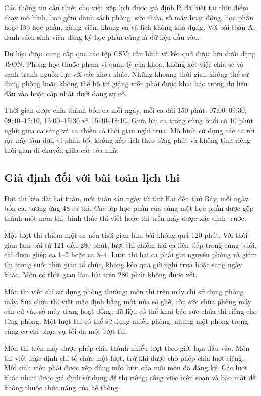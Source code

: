Các thông tin cần thiết cho việc xếp lịch được giả định là đã biết tại thời điểm chạy mô hình, bao gồm danh sách phòng, sức chứa, số máy hoạt động, học phần hoặc lớp học phần, giảng viên, khung ca và lịch không khả dụng. Với bài toán A, danh sách sinh viên đăng ký học phần cũng là dữ liệu đầu vào.

Dữ liệu được cung cấp qua các tệp CSV; cấu hình và kết quả được lưu dưới dạng JSON. Phòng học thuộc phạm vi quản lý của khoa, không xét việc chia sẻ và cạnh tranh nguồn lực với các khoa khác. Những khoảng thời gian không thể sử dụng phòng hoặc không thể bố trí giảng viên phải được khai báo trong dữ liệu đầu vào hoặc cập nhật dưới dạng sự cố.

Thời gian được chia thành bốn ca mỗi ngày, mỗi ca dài 150 phút: 07:00--09:30, 09:40--12:10, 13:00--15:30 và 15:40--18:10. Giữa hai ca trong cùng buổi có 10 phút nghỉ; giữa ca sáng và ca chiều có thời gian nghỉ trưa. Mô hình sử dụng các ca rời rạc này làm đơn vị phân bổ, không xếp lịch theo từng phút và không tính riêng thời gian di chuyển giữa các tòa nhà.

\subsection{Giả định đối với bài toán lịch thi}

Đợt thi kéo dài hai tuần, mỗi tuần sáu ngày từ thứ Hai đến thứ Bảy, mỗi ngày bốn ca, tương ứng 48 ca thi. Các lớp học phần của cùng một học phần được gộp thành một môn thi; hình thức thi viết hoặc thi trên máy được xác định trước.

Một lượt thi chiếm một ca nếu thời gian làm bài không quá 120 phút. Với thời gian làm bài từ 121 đến 280 phút, lượt thi chiếm hai ca liên tiếp trong cùng buổi, chỉ được ghép ca 1--2 hoặc ca 3--4. Lượt thi hai ca phải giữ nguyên phòng và giám thị trong suốt thời gian tổ chức, không kéo qua giờ nghỉ trưa hoặc sang ngày khác. Môn có thời gian làm bài trên 280 phút không được xét.

Môn thi viết chỉ sử dụng phòng thường; môn thi trên máy chỉ sử dụng phòng máy. Sức chứa thi viết mặc định bằng một nửa số ghế, còn sức chứa phòng máy căn cứ vào số máy đang hoạt động; dữ liệu có thể khai báo sức chứa thi riêng cho từng phòng. Một lượt thi có thể sử dụng nhiều phòng, nhưng một phòng trong cùng ca chỉ phục vụ tối đa một lượt thi.

Môn thi trên máy được phép chia thành nhiều lượt theo giới hạn đầu vào. Môn thi viết mặc định chỉ tổ chức một lượt, trừ khi được cho phép chia lượt riêng. Mỗi sinh viên phải được xếp đúng một lượt của mỗi môn đã đăng ký. Các lượt khác nhau được giả định sử dụng đề thi riêng; công việc biên soạn và bảo mật đề không thuộc chức năng của hệ thống.

